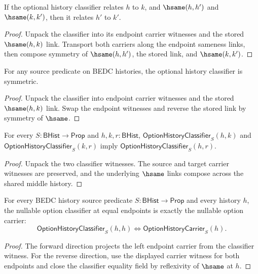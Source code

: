 \begin{theorem}
\label{thm:option-history-classifier-hsame-transport}
If the optional history classifier relates $h$ to $k$, and
$\hsame(h,h')$ and $\hsame(k,k')$, then it relates $h'$ to $k'$.
\end{theorem}
\begin{proof}
Unpack the classifier into its endpoint carrier witnesses and the stored
$\hsame(h,k)$ link. Transport both carriers along the endpoint sameness
links, then compose symmetry of $\hsame(h,h')$, the stored link, and
$\hsame(k,k')$.
\end{proof}

\begin{theorem}
\label{thm:option-history-classifier-symmetry}
For any source predicate on BEDC histories, the optional history classifier is
symmetric.
\end{theorem}
\begin{proof}
Unpack the classifier into endpoint carrier witnesses and the stored
$\hsame(h,k)$ link. Swap the endpoint witnesses and reverse the stored link
by symmetry of $\hsame$.
\end{proof}

\begin{theorem}
\label{thm:option-history-classifier-transitivity}
For every $S:\mathsf{BHist}\to\mathsf{Prop}$ and $h,k,r:\mathsf{BHist}$, $\mathsf{OptionHistoryClassifier}_S(h,k)$ and $\mathsf{OptionHistoryClassifier}_S(k,r)$ imply
$\mathsf{OptionHistoryClassifier}_S(h,r)$.
\end{theorem}
\begin{proof}
Unpack the two classifier witnesses. The source and target carrier witnesses
are preserved, and the underlying $\hsame$ links compose across the shared
middle history.
\end{proof}

\begin{theorem}
\label{thm:option-history-classifier-self-exactness}
For every BEDC history source predicate $S:\mathsf{BHist}\to\mathsf{Prop}$
and every history $h$, the nullable option classifier at equal endpoints is
exactly the nullable option carrier:
$$
\mathsf{OptionHistoryClassifier}_S(h,h)
\Longleftrightarrow
\mathsf{OptionHistoryCarrier}_S(h).
$$
\end{theorem}
\begin{proof}
The forward direction projects the left endpoint carrier from the classifier
witness. For the reverse direction, use the displayed carrier witness for both
endpoints and close the classifier equality field by reflexivity of $\hsame$ at
$h$.
\end{proof}

